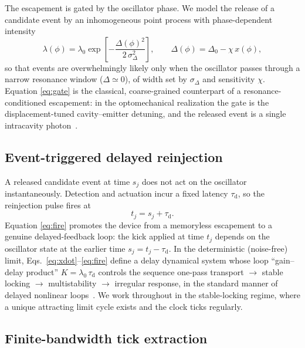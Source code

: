 \documentclass[aps,pre,reprint,amsmath,amssymb,floatfix,nofootinbib]{revtex4-2}
\newcommand{\taud}{\tau_{\mathrm{d}}}
\begin{document}
The escapement is gated by the oscillator phase. We model the release of
a candidate event by an inhomogeneous point process with phase-dependent
intensity
\begin{equation}
  \lambda(\phi) = \lambda_0
  \exp\!\left[-\frac{\Delta(\phi)^2}{2\,\sigma_\Delta^2}\right],
  \qquad
  \Delta(\phi) = \Delta_0 - \chi\,x(\phi),
  \label{eq:gate}
\end{equation}
so that events are overwhelmingly likely only when the oscillator passes
through a narrow resonance window ($\Delta\simeq 0$), of width set by
$\sigma_\Delta$ and sensitivity $\chi$. Equation \eqref{eq:gate} is the
classical, coarse-grained counterpart of a resonance-conditioned
escapement: in the optomechanical realization the gate is the
displacement-tuned cavity--emitter detuning, and the released event is a
single intracavity photon~\cite{Brunelli2026}.

\subsection{Event-triggered delayed reinjection}

A released candidate event at time $s_j$ does not act on the oscillator
instantaneously. Detection and actuation incur a fixed latency $\taud$,
so the reinjection pulse fires at
\begin{equation}
  t_{j} = s_{j} + \taud .
  \label{eq:fire}
\end{equation}
Equation \eqref{eq:fire} promotes the device from a memoryless escapement
to a genuine delayed-feedback loop: the kick applied at time $t_j$
depends on the oscillator state at the earlier time $s_j=t_j-\taud$. In
the deterministic (noise-free) limit, Eqs.~\eqref{eq:xdot}--\eqref{eq:fire}
define a delay dynamical system whose loop ``gain--delay product''
$K=\lambda_0\,\taud$ controls the sequence one-pass transport
$\to$ stable locking $\to$ multistability $\to$ irregular
response, in the standard manner of delayed nonlinear
loops~\cite{GiacomelliPoliti1996,YanchukGiacomelli2017}. We work
throughout in the stable-locking regime, where a unique attracting limit
cycle exists and the clock ticks regularly.

\subsection{Finite-bandwidth tick extraction}
\end{document}
